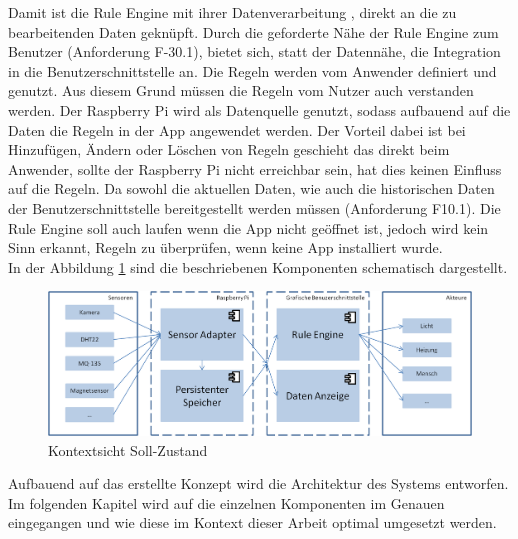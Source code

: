 Damit ist die Rule Engine mit ihrer Datenverarbeitung \cite{Hayes-Roth:1985:RS:4284.4286}, direkt an die zu bearbeitenden Daten geknüpft. Durch die geforderte Nähe der Rule Engine zum Benutzer (Anforderung F-30.1), bietet sich, statt der Datennähe, die Integration in die Benutzerschnittstelle an. Die Regeln werden vom Anwender definiert und genutzt. Aus diesem Grund müssen die Regeln vom Nutzer auch verstanden werden. Der Raspberry Pi wird als Datenquelle genutzt, sodass aufbauend auf die Daten die Regeln in der App angewendet werden. Der Vorteil dabei ist bei Hinzufügen, Ändern oder Löschen von Regeln geschieht das direkt beim Anwender, sollte der Raspberry Pi nicht erreichbar sein, hat dies keinen Einfluss auf die Regeln. Da sowohl die aktuellen Daten, wie auch die historischen Daten der Benutzerschnittstelle bereitgestellt werden müssen (Anforderung F10.1). Die Rule Engine soll auch laufen wenn die App nicht geöffnet ist, jedoch wird kein Sinn erkannt, Regeln zu überprüfen, wenn keine App installiert wurde.\\
In der Abbildung \ref{fig:M1} sind die beschriebenen Komponenten schematisch dargestellt.\\
\begin{figure}
	\centering
	\includegraphics[width=1\textwidth]{images/Konzept_allgemein.png}
	\caption{Kontextsicht Soll-Zustand}
	\label{fig:M1}
\end{figure}
Aufbauend auf das erstellte Konzept wird die Architektur des Systems entworfen. Im folgenden Kapitel wird auf die einzelnen Komponenten im Genauen eingegangen und wie diese im Kontext dieser Arbeit optimal umgesetzt werden. 
